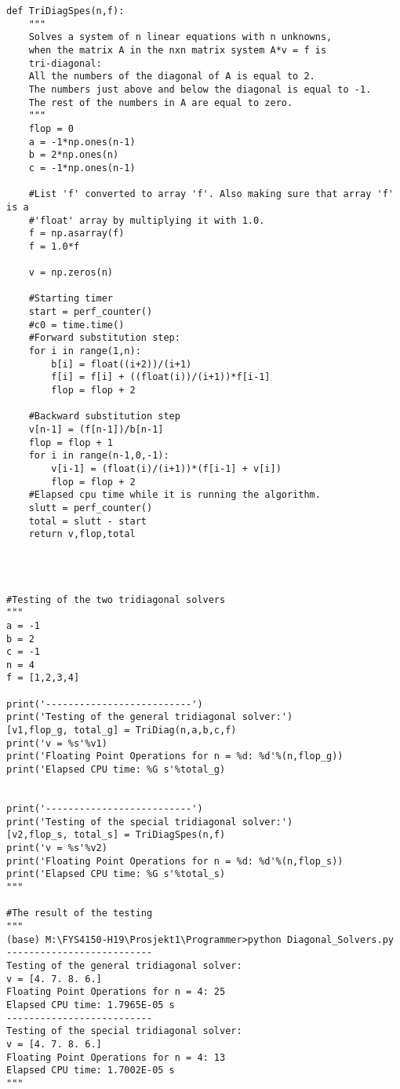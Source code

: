 \documentclass[11pt]{article}
\begin{document}
\begin{verbatim}
def TriDiagSpes(n,f):
    """
    Solves a system of n linear equations with n unknowns,
    when the matrix A in the nxn matrix system A*v = f is 
    tri-diagonal: 
    All the numbers of the diagonal of A is equal to 2.
    The numbers just above and below the diagonal is equal to -1.
    The rest of the numbers in A are equal to zero.
    """
    flop = 0
    a = -1*np.ones(n-1)
    b = 2*np.ones(n)
    c = -1*np.ones(n-1)
   
    #List 'f' converted to array 'f'. Also making sure that array 'f' is a
    #'float' array by multiplying it with 1.0.
    f = np.asarray(f)
    f = 1.0*f	
	
    v = np.zeros(n)

    #Starting timer
    start = perf_counter()
    #c0 = time.time()
    #Forward substitution step:
    for i in range(1,n):
        b[i] = float((i+2))/(i+1)
        f[i] = f[i] + ((float(i))/(i+1))*f[i-1]
        flop = flop + 2

    #Backward substitution step
    v[n-1] = (f[n-1])/b[n-1]
    flop = flop + 1
    for i in range(n-1,0,-1):
        v[i-1] = (float(i)/(i+1))*(f[i-1] + v[i])
        flop = flop + 2
    #Elapsed cpu time while it is running the algorithm.
    slutt = perf_counter()
    total = slutt - start
    return v,flop,total




#Testing of the two tridiagonal solvers
"""
a = -1
b = 2
c = -1
n = 4
f = [1,2,3,4]

print('--------------------------')
print('Testing of the general tridiagonal solver:')
[v1,flop_g, total_g] = TriDiag(n,a,b,c,f)
print('v = %s'%v1)
print('Floating Point Operations for n = %d: %d'%(n,flop_g))
print('Elapsed CPU time: %G s'%total_g)


print('--------------------------')
print('Testing of the special tridiagonal solver:')
[v2,flop_s, total_s] = TriDiagSpes(n,f)
print('v = %s'%v2)
print('Floating Point Operations for n = %d: %d'%(n,flop_s))
print('Elapsed CPU time: %G s'%total_s)
"""

#The result of the testing
"""
(base) M:\FYS4150-H19\Prosjekt1\Programmer>python Diagonal_Solvers.py
--------------------------
Testing of the general tridiagonal solver:
v = [4. 7. 8. 6.]
Floating Point Operations for n = 4: 25
Elapsed CPU time: 1.7965E-05 s
--------------------------
Testing of the special tridiagonal solver:
v = [4. 7. 8. 6.]
Floating Point Operations for n = 4: 13
Elapsed CPU time: 1.7002E-05 s
"""


\end{verbatim}
\end{document}
